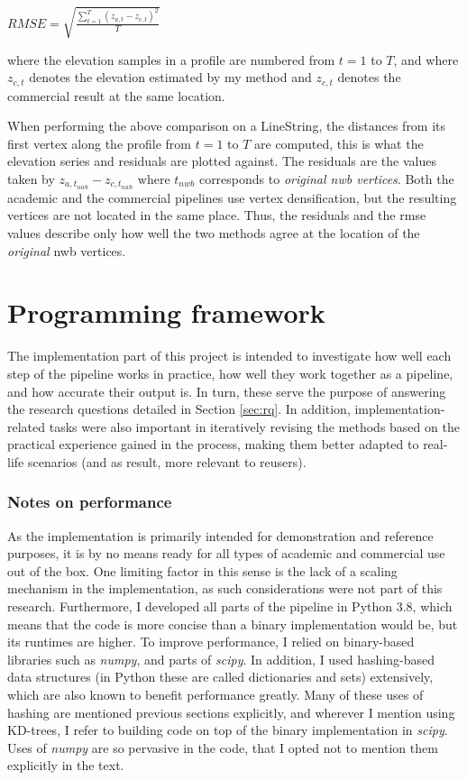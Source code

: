 $RMSE = \sqrt{\frac{\sum_{t=1}^{T}\left(z_{a,t} - z_{c,t}\right)^2}{T}}$

where the elevation samples in a profile are numbered from $t=1$ to $T$, and where $z_{c,t}$ denotes the elevation estimated by my method and $z_{c,t}$ denotes the commercial result at the same location.

When performing the above comparison on a LineString, the distances from its first vertex along the profile from $t=1$ to $T$ are computed, this is what the elevation series and residuals are plotted against. The residuals are the values taken by $z_{a,t_{nwb}} - z_{c,t_{nwb}}$ where $t_{nwb}$ corresponds to \textit{original \ac{nwb} vertices}. Both the academic and the commercial pipelines use vertex densification, but the resulting vertices are not located in the same place. Thus, the residuals and the \ac{rmse} values describe only how well the two methods agree at the location of the \textit{original} \ac{nwb} vertices.

\section{Programming framework}
\label{sec:programming}

The implementation part of this project is intended to investigate how well each step of the pipeline works in practice, how well they work together as a pipeline, and how accurate their output is. In turn, these serve the purpose of answering the research questions detailed in Section \ref{sec:rq}. In addition, implementation-related tasks were also important in iteratively revising the methods based on the practical experience gained in the process, making them better adapted to real-life scenarios (and as result, more relevant to reusers).

\subsubsection{Notes on performance}

As the implementation is primarily intended for demonstration and reference purposes, it is by no means ready for all types of academic and commercial use out of the box. One limiting factor in this sense is the lack of a scaling mechanism in the implementation, as such considerations were not part of this research. Furthermore, I developed all parts of the pipeline in Python 3.8, which means that the code is more concise than a binary implementation would be, but its runtimes are higher. To improve performance, I relied on binary-based libraries such as \textit{numpy}, and parts of \textit{scipy}. In addition, I used hashing-based data structures (in Python these are called dictionaries and sets) extensively, which are also known to benefit performance greatly. Many of these uses of hashing are mentioned previous sections explicitly, and wherever I mention using KD-trees, I refer to building code on top of the binary implementation in \textit{scipy}. Uses of \textit{numpy} are so pervasive in the code, that I opted not to mention them explicitly in the text.

